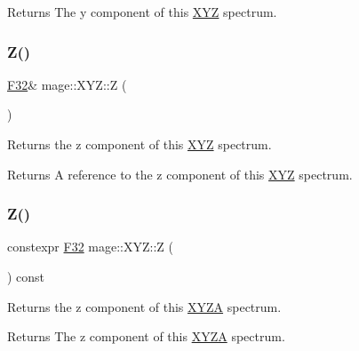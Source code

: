 \begin{DoxyReturn}{Returns}
The y component of this \mbox{\hyperlink{structmage_1_1_x_y_z}{X\+YZ}} spectrum. 
\end{DoxyReturn}
\mbox{\label{structmage_1_1_x_y_z_a3373a4b3b08a49027310f488a03df5df}} 
\subsubsection{\texorpdfstring{Z()}{Z()}\hspace{0.1cm}{\footnotesize\ttfamily [1/2]}}
{\footnotesize\ttfamily \mbox{\hyperlink{namespacemage_aa97e833b45f06d60a0a9c4fc22ae02c0}{F32}}\& mage\+::\+X\+Y\+Z\+::Z (\begin{DoxyParamCaption}{ }\end{DoxyParamCaption})\hspace{0.3cm}{\ttfamily [noexcept]}}

Returns the z component of this \mbox{\hyperlink{structmage_1_1_x_y_z}{X\+YZ}} spectrum.

\begin{DoxyReturn}{Returns}
A reference to the z component of this \mbox{\hyperlink{structmage_1_1_x_y_z}{X\+YZ}} spectrum. 
\end{DoxyReturn}
\mbox{\label{structmage_1_1_x_y_z_ad7a039b462416d0548a53aa7025af70b}} 
\subsubsection{\texorpdfstring{Z()}{Z()}\hspace{0.1cm}{\footnotesize\ttfamily [2/2]}}
{\footnotesize\ttfamily constexpr \mbox{\hyperlink{namespacemage_aa97e833b45f06d60a0a9c4fc22ae02c0}{F32}} mage\+::\+X\+Y\+Z\+::Z (\begin{DoxyParamCaption}{ }\end{DoxyParamCaption}) const\hspace{0.3cm}{\ttfamily [noexcept]}}

Returns the z component of this \mbox{\hyperlink{structmage_1_1_x_y_z_a}{X\+Y\+ZA}} spectrum.

\begin{DoxyReturn}{Returns}
The z component of this \mbox{\hyperlink{structmage_1_1_x_y_z_a}{X\+Y\+ZA}} spectrum. 
\end{DoxyReturn}
